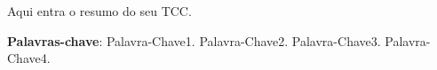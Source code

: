 \def \palavraschaves{Palavra-Chave1. Palavra-Chave2. Palavra-Chave3. Palavra-Chave4.}
\begin{resumo}  
Aqui entra o resumo do seu TCC.

\vspace{\onelineskip} 

\noindent \textbf{Palavras-chave}: \palavraschaves
\end{resumo}